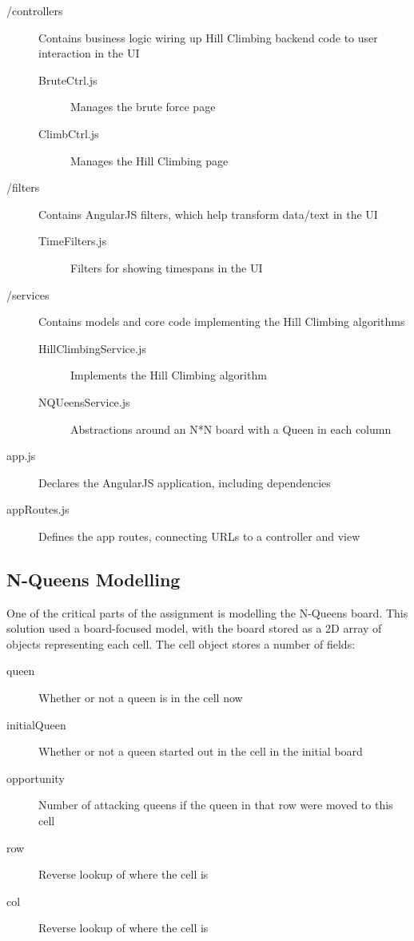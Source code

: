 \begin{description}
  \item[/controllers]   Contains business logic wiring up Hill Climbing backend code to user interaction in the UI
  \begin{description}
    \item[BruteCtrl.js]             Manages the brute force page
    \item[ClimbCtrl.js]             Manages the Hill Climbing page
  \end{description}
  \item[/filters]       Contains AngularJS filters, which help transform data/text in the UI
  \begin{description}
    \item[TimeFilters.js]           Filters for showing timespans in the UI
  \end{description}
  \item[/services]      Contains models and core code implementing the Hill Climbing algorithms
  \begin{description}
    \item[HillClimbingService.js]   Implements the Hill Climbing algorithm
    \item[NQUeensService.js]        Abstractions around an N*N board with a Queen in each column
  \end{description}
  \item[app.js]         Declares the AngularJS application, including dependencies
  \item[appRoutes.js]   Defines the app routes, connecting URLs to a controller and view
\end{description}

\subsection{N-Queens Modelling}
One of the critical parts of the assignment is modelling the N-Queens board. This solution used a board-focused model,
with the board stored as a 2D array of objects representing each cell. The cell object stores a number of fields:

\begin{description}
\item[queen] Whether or not a queen is in the cell now
\item[initialQueen] Whether or not a queen started out in the cell in the initial board
\item[opportunity] Number of attacking queens if the queen in that row were moved to this cell
\item[row] Reverse lookup of where the cell is
\item[col] Reverse lookup of where the cell is
\end{description}

